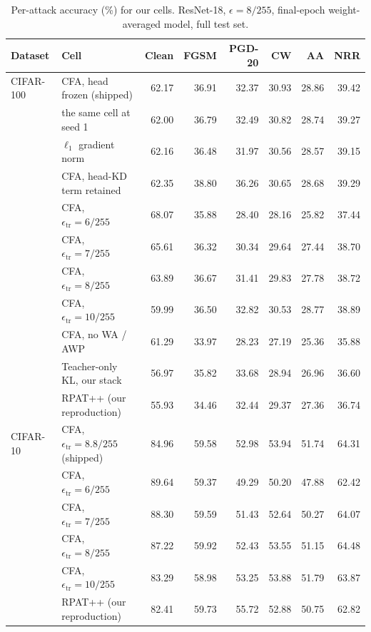 \documentclass{article} %
\theoremstyle{plain}
\begin{document}
\begin{table}[!htbp]
  \centering \small \setlength{\tabcolsep}{4.5pt}
  \caption{Per-attack accuracy (\%) for our cells. ResNet-18, $\epsilon = 8/255$, final-epoch
  weight-averaged model, full test set.}
  \label{tab:fullmetrics}
  \begin{tabular}{llrrrrrr}
    \toprule
    Dataset & Cell & Clean & FGSM & PGD-20 & CW & AA & NRR \\
    \midrule
    CIFAR-100 & CFA, head frozen (shipped)   & 62.17 & 36.91 & 32.37 & 30.93 & 28.86 & 39.42 \\
              & \quad the same cell at seed 1 & 62.00 & 36.79 & 32.49 & 30.82 & 28.74 & 39.27 \\
              & \quad $\ell_1$ gradient norm  & 62.16 & 36.48 & 31.97 & 30.56 & 28.57 & 39.15 \\
              & CFA, head-KD term retained   & 62.35 & 38.80 & 36.26 & 30.65 & 28.68 & 39.29 \\
              & CFA, $\epsilon_{\mathrm{tr}} = 6/255$ & 68.07 & 35.88 & 28.40 & 28.16 & 25.82 & 37.44 \\
              & CFA, $\epsilon_{\mathrm{tr}} = 7/255$ & 65.61 & 36.32 & 30.34 & 29.64 & 27.44 & 38.70 \\
              & CFA, $\epsilon_{\mathrm{tr}} = 8/255$ & 63.89 & 36.67 & 31.41 & 29.83 & 27.78 & 38.72 \\
              & CFA, $\epsilon_{\mathrm{tr}} = 10/255$& 59.99 & 36.50 & 32.82 & 30.53 & 28.77 & 38.89 \\
              & CFA, no WA / AWP             & 61.29 & 33.97 & 28.23 & 27.19 & 25.36 & 35.88 \\
              & Teacher-only KL, our stack   & 56.97 & 35.82 & 33.68 & 28.94 & 26.96 & 36.60 \\
              & RPAT++ (our reproduction)    & 55.93 & 34.46 & 32.44 & 29.37 & 27.36 & 36.74 \\
    \midrule
    CIFAR-10  & CFA, $\epsilon_{\mathrm{tr}} = 8.8/255$ (shipped) & 84.96 & 59.58 & 52.98 & 53.94 & 51.74 & 64.31 \\
              & CFA, $\epsilon_{\mathrm{tr}} = 6/255$  & 89.64 & 59.37 & 49.29 & 50.20 & 47.88 & 62.42 \\
              & CFA, $\epsilon_{\mathrm{tr}} = 7/255$  & 88.30 & 59.59 & 51.43 & 52.64 & 50.27 & 64.07 \\
              & CFA, $\epsilon_{\mathrm{tr}} = 8/255$  & 87.22 & 59.92 & 52.43 & 53.55 & 51.15 & 64.48 \\
              & CFA, $\epsilon_{\mathrm{tr}} = 10/255$ & 83.29 & 58.98 & 53.25 & 53.88 & 51.79 & 63.87 \\
              & RPAT++ (our reproduction)    & 82.41 & 59.73 & 55.72 & 52.88 & 50.75 & 62.82 \\
    \bottomrule
  \end{tabular}
\end{table}
\end{document}
